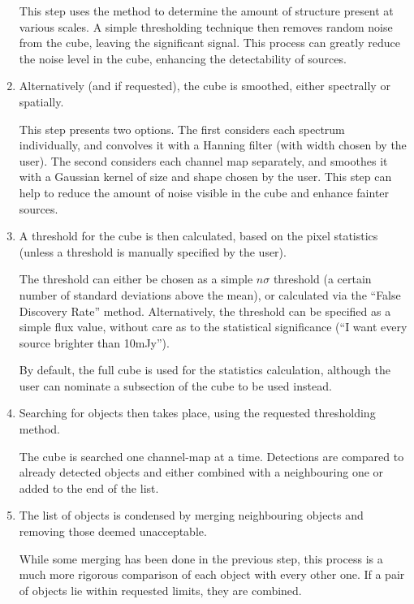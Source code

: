 \begin{enumerate}
  This step uses the \atrous method to determine the amount of
  structure present at various scales. A simple thresholding technique
  then removes random noise from the cube, leaving the significant
  signal. This process can greatly reduce the noise level in the cube,
  enhancing the detectability of sources.

\item Alternatively (and if requested), the cube is smoothed, either
  spectrally or spatially.

  This step presents two options. The first considers each spectrum
  individually, and convolves it with a Hanning filter (with width
  chosen by the user). The second considers each channel map
  separately, and smoothes it with a Gaussian kernel of size and shape
  chosen by the user. This step can help to reduce the amount of noise
  visible in the cube and enhance fainter sources.

\item A threshold for the cube is then calculated, based on the pixel
  statistics (unless a threshold is manually specified by the user).

  The threshold can either be chosen as a simple $n\sigma$ threshold
  (\ie a certain number of standard deviations above the mean), or
  calculated via the ``False Discovery Rate'' method. Alternatively,
  the threshold can be specified as a simple flux value, without care
  as to the statistical significance (\eg ``I want every source
  brighter than 10mJy'').

  By default, the full cube is used for the statistics calculation,
  although the user can nominate a subsection of the cube to be used
  instead. 

\item Searching for objects then takes place, using the requested
  thresholding method.

  The cube is searched one channel-map at a time. Detections are
  compared to already detected objects and either combined with a
  neighbouring one or added to the end of the list.

\item The list of objects is condensed by merging neighbouring objects
  and removing those deemed unacceptable.

  While some merging has been done in the previous step, this process
  is a much more rigorous comparison of each object with every other
  one. If a pair of objects lie within requested limits, they are
  combined. 


\end{enumerate}
